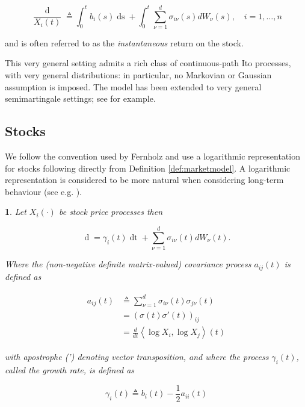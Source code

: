 \documentclass[british]{amsart}
\numberwithin{equation}{section}
\numberwithin{figure}{section}
\theoremstyle{plain}
\theoremstyle{definition}
\theoremstyle{plain}
\theoremstyle{plain}
\newtheorem{lem}[thm]{\protect\lemmaname}
\theoremstyle{plain}
\theoremstyle{remark}
\theoremstyle{plain}
\providecommand{\lemmaname}{Lemma}
\renewcommand{\d}[1]{\mathop{\mathrm{d}{#1}}}
\newcommand{\defeq}{\mathop{\triangleq}}
\newcommand{\rangei}{i=1,\dots,n}
\begin{document}
\begin{equation*} \frac{\d{X_{i}(t)}}{X_{i}(t)} \defeq \int_{0}^{t}
b_{i}(s)\d{s} + \int_{0}^{t} \sum_{\nu=1}^{d} \sigma_{i\nu}(s) dW_{\nu}(s),
\quad \rangei \end{equation*}

and is often referred to as the \textit{instantaneous} return on the stock.

This very general setting admits a rich class of continuous-path Ito processes,
with very general distributions: in particular, no Markovian or Gaussian
assumption is imposed. The model has been extended to very general
semimartingale settings; see \cite{kardaras2003} for example.

\newpage

\subsection{Stocks}

We follow the convention used by Fernholz and use a logarithmic representation
for stocks following directly from Definition \ref{def:marketmodel}. A
logarithmic representation is considered to be more natural when considering
long-term behaviour (see e.g. \cite{fernholz1982}). 

\begin{lem} \cite{fernholz1999pgf} \label{thm:logarithmicrepresentation} Let
$X_{i}(\cdot)$ be stock price processes then

  \begin{equation} \label{eq:logX} \d{{X_{i}(t)}} = \gamma_{i}(t) \d{t}  +
\sum_{\nu=1}^{d} \sigma_{i\nu}(t) dW_{\nu}(t). \end{equation}

  Where the (non-negative definite matrix-valued) \textit{covariance process}
$a_{ij}(t)$ is defined as
  
  \begin{gather} \label{eq:covarianceprocess} \begin{split} a_{ij}(t)  & \defeq
\sum_{\nu=1}^{d}\sigma_{i\nu}(t)\sigma_{j\nu}(t) \\ & = \left(
\sigma(t)\sigma'(t) \right)_{ij} \\ & = \frac{d}{dt}\left\langle \log X_{i},\log
X_{j}\right\rangle(t) \end{split} \end{gather}

  with apostrophe (') denoting vector transposition, and where the process
$\gamma_{i}(t)$, called the \textit{growth rate}, is defined as

  \begin{equation} \label{eq:gamma} \gamma_{i}(t)\defeq
b_{i}(t)-\frac{1}{2}a_{ii}(t) \end{equation}

\end{lem}
\end{document}
